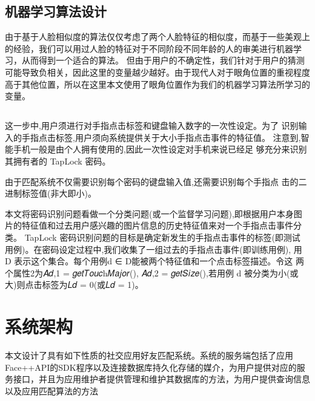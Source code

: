 \subsection{机器学习算法设计}
由于基于人脸相似度的算法仅仅考虑了两个人脸特征的相似度，而基于一些美观上的经验，我们可以用过人脸的特征对于不同阶段不同年龄的人的审美进行机器学习，从而得到一个适合的算法。
但由于用户的不确定性，我们针对于用户的猜测可能导致负相关，因此这里的变量越少越好。由于现代人对于眼角位置的重视程度高于其他位置，所以在这里本文使用了眼角位置作为我们的机器学习算法所学习的变量。
\subsection{}





这一步中,用户须进行对手指点击标签和键盘输入数字的一次性设定。为了 识别输入的手指点击标签,用户须向系统提供关于大小手指点击事件的特征值。 注意到,智能手机一般是由个人拥有使用的,因此一次性设定对手机来说已经足 够充分来识别其拥有者的 TapLock 密码。



由于匹配系统不仅需要识别每个密码的键盘输入值,还需要识别每个手指点 击的二进制标签值(非大即小)。

本文将密码识别问题看做一个分类问题(或一个监督学习问题),即根据用户本身图片的特征值和过去用户感兴趣的图片信息的历史特征值来对一个手指点击事件分类。
TapLock 密码识别问题的目标是确定新发生的手指点击事件的标签(即测试 用例)。在密码设定过程中,我们收集了一组过去的手指点击事件(即训练用例), 用 D 表示这个集合。每个用例d ∈ D能被两个特征值和一个点击标签描述。令这 两个属性2为𝐴𝑑,1 = 𝑔𝑒𝑡𝑇𝑜𝑢𝑐h𝑀𝑎𝑗𝑜𝑟(), 𝐴𝑑,2 = 𝑔𝑒𝑡𝑆𝑖𝑧𝑒(),若用例 d 被分类为小(或 大)则点击标签为𝐿𝑑 = 0(或𝐿𝑑 = 1)。

\section{系统架构}
本文设计了具有如下性质的社交应用好友匹配系统。系统的服务端包括了应用Face++API的SDK程序以及连接数据库持久化存储的媒介，为用户提供对应的服务接口，并且为应用维护者提供管理和维护其数据库的方法，为用户提供查询信息以及应用匹配算法的方法
